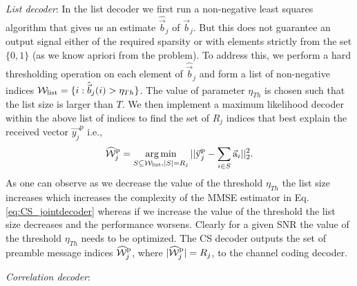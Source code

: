 \textit{List decoder}: In the list decoder we first run a non-negative least squares %
algorithm that gives us an estimate $\hat{\vec{b}}_j$ of $\vec{b}_j$. But this does not guarantee an output signal either of the required sparsity or with elements strictly from the set $\{0,1\}$ (as we know apriori from the problem). To address this, we perform a hard thresholding operation on each element of $\hat{\vec{b}}_j$ and form a list of non-negative indices $\mathcal{W}_{\text{list}}=\{i:\hat{\vec{b}}_j(i)>\eta_{Th}\}$. The value of parameter $\eta_{Th}$ is chosen such that the list size is larger than $T$. We then implement a maximum likelihood decoder within the above list of indices to find the set of $R_j$ indices that best explain the received vector $\vec{y_j}^{\mathrm{p}}$ i.e.,
\begin{equation}
\widehat{\mathcal{W}}_j^{\mathrm{p}}=\operatorname*{arg\,min}_{S\subseteq\mathcal{W}_{\text{list}},|S|=R_j}||\vec{\mathrm{y}}_j^{\mathrm{p}}-\sum_{i\in S}\vec{\mathrm{a}}_i||^2_2.
\label{eq:CS_jointdecoder}
\end{equation}
As one can observe as we decrease the value of the threshold $\eta_{Th}$ the list size increases which increases the complexity of the MMSE estimator in Eq. \eqref{eq:CS_jointdecoder} whereas if we increase the value of the threshold the list size decreases and the performance worsens. Clearly for a given SNR the value of the threshold $\eta_{Th}$ needs to be optimized. The CS decoder outputs the set of preamble message indices $\widehat{\mathcal{W}}_j^{\mathrm{p}}$, where $|\widehat{\mathcal{W}}_j^{\mathrm{p}}|=R_j$, to the channel coding decoder.

\textit{Correlation decoder}:
%
%

